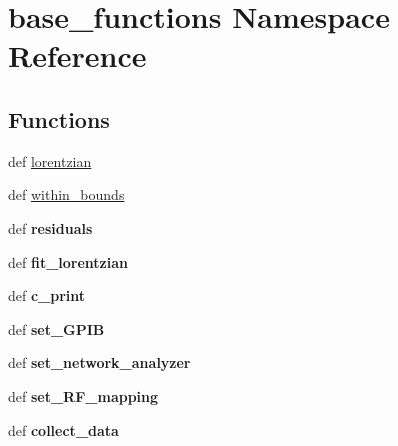 \hypertarget{namespacebase__functions}{\section{base\-\_\-functions Namespace Reference}
\label{namespacebase__functions}
}
\subsection*{Functions}
\begin{DoxyCompactItemize}
\item 
def \hyperlink{namespacebase__functions_aafaf676e7d2e85407d93582876e0fc78}{lorentzian}
\item 
def \hyperlink{namespacebase__functions_ac6b43d21a149ec318825184dafa16779}{within\-\_\-bounds}
\item 
\hypertarget{namespacebase__functions_acb1468fbd4a1e4a2ea708bb8940f9b90}{def {\bfseries residuals}}\label{namespacebase__functions_acb1468fbd4a1e4a2ea708bb8940f9b90}

\item 
\hypertarget{namespacebase__functions_ab79c7376c5d0710cf90a08c5f5e0febb}{def {\bfseries fit\-\_\-lorentzian}}\label{namespacebase__functions_ab79c7376c5d0710cf90a08c5f5e0febb}

\item 
\hypertarget{namespacebase__functions_a4950a5e86cc36dcf02cc6e6ab8fcb92c}{def {\bfseries c\-\_\-print}}\label{namespacebase__functions_a4950a5e86cc36dcf02cc6e6ab8fcb92c}

\item 
\hypertarget{namespacebase__functions_ab9ae59e5aac4be2f2a16c39f75ca4b8d}{def {\bfseries set\-\_\-\-G\-P\-I\-B}}\label{namespacebase__functions_ab9ae59e5aac4be2f2a16c39f75ca4b8d}

\item 
\hypertarget{namespacebase__functions_a91c83d9ec0d481b7b90512002cb8f9fc}{def {\bfseries set\-\_\-network\-\_\-analyzer}}\label{namespacebase__functions_a91c83d9ec0d481b7b90512002cb8f9fc}

\item 
\hypertarget{namespacebase__functions_ac5f7330d31c470d70a3fc906b390e802}{def {\bfseries set\-\_\-\-R\-F\-\_\-mapping}}\label{namespacebase__functions_ac5f7330d31c470d70a3fc906b390e802}

\item 
\hypertarget{namespacebase__functions_ad99612eb3c0f5c0f3ae9134a0268ae19}{def {\bfseries collect\-\_\-data}}\label{namespacebase__functions_ad99612eb3c0f5c0f3ae9134a0268ae19}


\end{DoxyCompactItemize}
